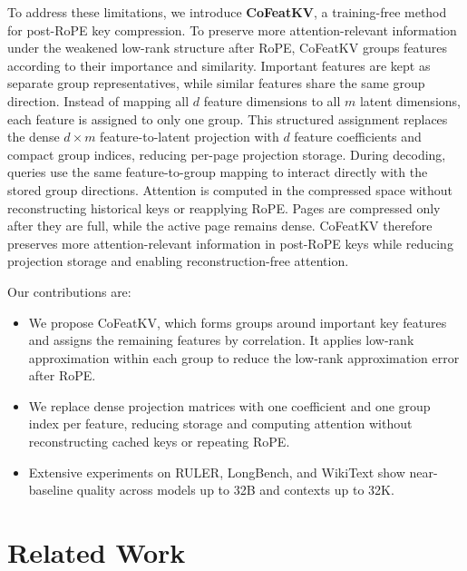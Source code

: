 \documentclass{article} %
\begin{document}
To address these limitations, we introduce \textbf{CoFeatKV}, a training-free
method for post-RoPE key compression. To preserve more attention-relevant
information under the weakened low-rank structure after RoPE, CoFeatKV groups
features according to their importance and similarity. Important features are
kept as separate group representatives, while similar features share the same
group direction. Instead of mapping all $d$ feature dimensions to all $m$
latent dimensions, each feature is assigned to only one group. This structured
assignment replaces the dense $d\times m$ feature-to-latent projection with
$d$ feature coefficients and compact group indices, reducing per-page
projection storage. During decoding, queries use the same feature-to-group mapping to interact
directly with the stored group directions. Attention is computed in the
compressed space without reconstructing historical keys or reapplying RoPE.
Pages are compressed only after they are full, while the active page remains
dense. CoFeatKV therefore preserves more attention-relevant information in
post-RoPE keys while reducing projection storage and enabling
reconstruction-free attention.

Our contributions are:
\begin{itemize}
    \item We propose CoFeatKV, which forms groups around important key features and
    assigns the remaining features by correlation. It applies low-rank
    approximation within each group to reduce the low-rank approximation error
    after RoPE.
    \item We replace dense projection matrices with one coefficient and one group index per feature, reducing storage and computing attention without reconstructing cached keys or repeating RoPE.
    \item Extensive experiments on RULER, LongBench, and WikiText show near-baseline
quality across models up to 32B and contexts up to 32K.
\end{itemize}

\section{Related Work}
\end{document}
